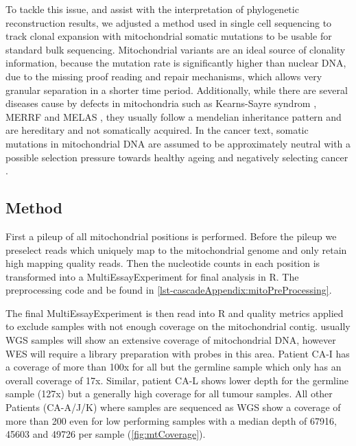 To tackle this issue, and assist with the interpretation of phylogenetic reconstruction results, we adjusted a method used in single cell sequencing to track clonal expansion with mitochondrial somatic mutations \cite{Ludwig2019} to be usable for standard bulk sequencing. Mitochondrial variants are an ideal source of clonality information, because the mutation rate is significantly higher than nuclear DNA, due to the missing proof reading and repair mechanisms, which allows very granular separation in a shorter time period. Additionally, while there are several diseases cause by defects in mitochondria such as Kearns-Sayre syndrom \cite{Harvey1992}, MERRF \cite{Adam1993} and MELAS \cite{Hirano1992}, they usually follow a mendelian inheritance pattern and are hereditary and not somatically acquired. In the cancer text, somatic mutations in mitochondrial DNA are assumed to be approximately neutral with a possible selection pressure towards healthy ageing and negatively selecting cancer \cite{Rodell2013,Yuan2020}.

\subsection{Method}
\label{cascade-sec:mitoMethod}

First a pileup of all mitochondrial positions is performed. Before the pileup we preselect reads which uniquely map to the mitochondrial genome and only retain high mapping quality reads. Then the nucleotide counts in each position is transformed into a MultiEssayExperiment \cite{Ramos2017} for final analysis in R. The preprocessing code and be found in \autoref{lst-cascadeAppendix:mitoPreProcessing}.

The final MultiEssayExperiment is then read into R and quality metrics applied to exclude samples with not enough coverage on the mitochondrial contig. usually WGS samples will show an extensive coverage of mitochondrial DNA, however WES will require a library preparation with probes in this area. Patient CA-I has a coverage of more than 100x for all but the germline sample which only has an overall coverage of 17x. Similar, patient CA-L shows lower depth for the germline sample (127x) but a generally high coverage for all tumour samples. All other Patients (CA-A/J/K) where samples are sequenced as WGS show a coverage of more than 200 even for low performing samples with a median depth of \num{67916}, \num{45603} and \num{49726} per sample (\autoref{fig:mtCoverage}).

